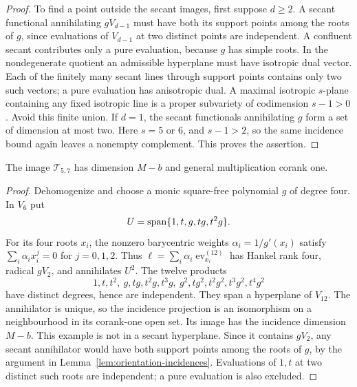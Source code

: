 \begin{proof}
To find a point outside the secant images, first suppose $d\ge2$.
A secant functional annihilating $gV_{d-1}$ must have both its support
points among the roots of $g$, since evaluations of $V_{d-1}$ at two
distinct points are independent. A confluent secant contributes only a
pure evaluation, because $g$ has simple roots. In the nondegenerate
quotient an admissible hyperplane must have isotropic dual vector.
Each of the finitely many secant lines through support points contains
only two such vectors; a pure evaluation has anisotropic dual.
A maximal isotropic $s$-plane containing any fixed isotropic line is a
proper subvariety of codimension $s-1>0$. Avoid this finite union.
If $d=1$, the secant functionals annihilating $g$ form a set of dimension
at most two. Here $s=5$ or $6$, and $s-1>2$, so the same incidence
bound again leaves a nonempty complement. This proves the assertion.
\end{proof}

\begin{lemma}\label{lem:excess-example}
The image $\mathcal T_{5,7}$ has dimension $M-b$ and general
multiplication corank one.
\end{lemma}
\begin{proof}
Dehomogenize and choose a monic square-free polynomial $g$ of degree
four. In $V_6$ put
\[
 U=\operatorname{span}\{1,t,g,tg,t^2g\}.
\]
For its four roots $x_i$, the nonzero barycentric weights
$\alpha_i=1/g'(x_i)$ satisfy
$\sum_i\alpha_i x_i^j=0$ for $j=0,1,2$. Thus
$\ell=\sum_i\alpha_i\operatorname{ev}_{x_i}^{(12)}$ has Hankel rank
four, radical $gV_2$, and annihilates $U^2$.
The twelve products
\[
 1,t,t^2,\ g,tg,t^2g,t^3g,\ g^2,tg^2,t^2g^2,t^3g^2,t^4g^2
\]
have distinct degrees, hence are independent. They span a hyperplane
of $V_{12}$. The annihilator is unique, so the incidence projection is
an isomorphism on a neighbourhood in its corank-one open set. Its
image has the incidence dimension $M-b$. This example is not in a
secant hyperplane. Since it contains $gV_2$, any secant annihilator
would have both support points among the roots of $g$, by the argument
in Lemma~\ref{lem:orientation-incidences}. Evaluations of $1,t$ at two
distinct such roots are independent; a pure evaluation is also excluded.
\end{proof}

